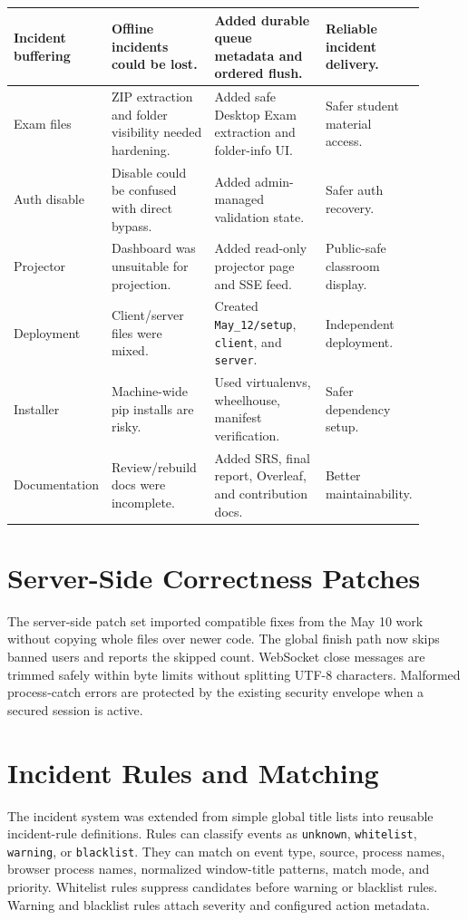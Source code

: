 \documentclass[conference]{IEEEtran}
\begin{document}
\begin{table}[htbp]
\begin{tabular}{P{0.16\linewidth} P{0.26\linewidth} P{0.30\linewidth} P{0.18\linewidth}}
Incident buffering & Offline incidents could be lost. & Added durable queue metadata and ordered flush. & Reliable incident delivery. \\
\midrule
Exam files & ZIP extraction and folder visibility needed hardening. & Added safe Desktop Exam extraction and folder-info UI. & Safer student material access. \\
\midrule
Auth disable & Disable could be confused with direct bypass. & Added admin-managed validation state. & Safer auth recovery. \\
\midrule
Projector & Dashboard was unsuitable for projection. & Added read-only projector page and SSE feed. & Public-safe classroom display. \\
\midrule
Deployment & Client/server files were mixed. & Created \texttt{May\_12/setup}, \texttt{client}, and \texttt{server}. & Independent deployment. \\
\midrule
Installer & Machine-wide pip installs are risky. & Used virtualenvs, wheelhouse, manifest verification. & Safer dependency setup. \\
\midrule
Documentation & Review/rebuild docs were incomplete. & Added SRS, final report, Overleaf, and contribution docs. & Better maintainability. \\
\bottomrule
\end{tabular}
\label{tab:patch-inventory}
\end{table}

\section{Server-Side Correctness Patches}

The server-side patch set imported compatible fixes from the May 10 work without copying whole files over newer code. The global finish path now skips banned users and reports the skipped count. WebSocket close messages are trimmed safely within byte limits without splitting UTF-8 characters. Malformed process-catch errors are protected by the existing security envelope when a secured session is active.

\section{Incident Rules and Matching}

The incident system was extended from simple global title lists into reusable incident-rule definitions. Rules can classify events as \texttt{unknown}, \texttt{whitelist}, \texttt{warning}, or \texttt{blacklist}. They can match on event type, source, process names, browser process names, normalized window-title patterns, match mode, and priority. Whitelist rules suppress candidates before warning or blacklist rules. Warning and blacklist rules attach severity and configured action metadata.
\end{document}
